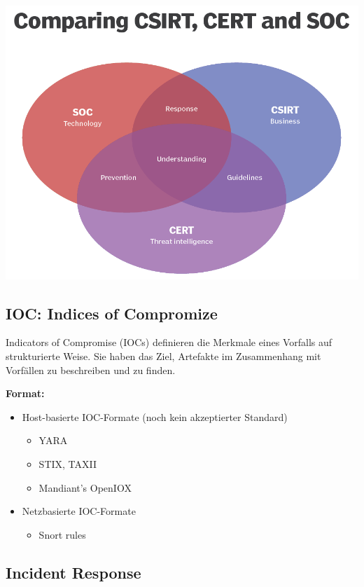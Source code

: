 \begin{center}
    \vspace{-8pt}
    \includegraphics[width=0.8\linewidth]{./img/02-begriffe/soc_cert_csirt}
    \vspace{-8pt}
\end{center}

\subsection{IOC: Indices of Compromize}
Indicators of Compromise (IOCs) definieren die Merkmale eines Vorfalls auf strukturierte Weise. Sie haben das Ziel, Artefakte im Zusammenhang mit Vorfällen zu beschreiben und zu finden.

\textbf{Format:}
\begin{itemize}
    \item Host-basierte IOC-Formate (noch kein akzeptierter Standard)
    \begin{itemize}
        \item YARA
        \item STIX, TAXII
        \item Mandiant's OpenIOX
    \end{itemize}
    \item Netzbasierte IOC-Formate
    \begin{itemize}
        \item Snort rules
    \end{itemize}
\end{itemize}

\subsection{Incident Response}

